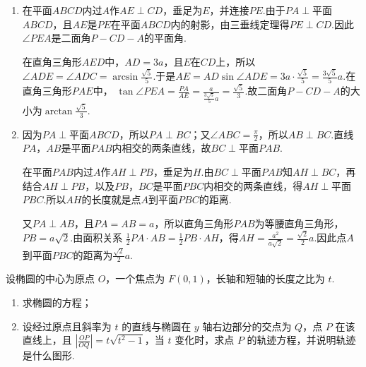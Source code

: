 \begin{solution}
\begin{enumerate}
\item 在平面\(ABCD\)内过\(A\)作\(AE\perp CD\)，垂足为\(E\)，并连接\(PE\).由于\(PA\perp\)平面\(ABCD\)，且\(AE\)是\(PE\)在平面\(ABCD\)内的射影，由三垂线定理得\(PE\perp CD\).因此\(\angle PEA\)是二面角\(P-CD-A\)的平面角.

在直角三角形\(AED\)中，\(AD=3a\)，且\(E\)在\(CD\)上，所以\(\angle ADE=\angle ADC=\arcsin\frac{\sqrt5}{5}\).于是\(AE=AD\sin\angle ADE=3a\cdot\frac{\sqrt5}{5}=\frac{3\sqrt5}{5}a\).在直角三角形\(PAE\)中，
\(\tan\angle PEA=\frac{PA}{AE}=\frac{a}{\frac{3\sqrt5}{5}a}=\frac{\sqrt5}{3}\).故二面角\(P-CD-A\)的大小为\(\arctan\frac{\sqrt5}{3}\).

\item 因为\(PA\perp\)平面\(ABCD\)，所以\(PA\perp BC\)；又\(\angle ABC=\frac{\pi}{2}\)，所以\(AB\perp BC\).直线\(PA\)，\(AB\)是平面\(PAB\)内相交的两条直线，故\(BC\perp\)平面\(PAB\).

在平面\(PAB\)内过\(A\)作\(AH\perp PB\)，垂足为\(H\).由\(BC\perp\)平面\(PAB\)知\(AH\perp BC\)，再结合\(AH\perp PB\)，以及\(PB\)，\(BC\)是平面\(PBC\)内相交的两条直线，得\(AH\perp\)平面\(PBC\).所以\(AH\)的长度就是点\(A\)到平面\(PBC\)的距离.

又\(PA\perp AB\)，且\(PA=AB=a\)，所以直角三角形\(PAB\)为等腰直角三角形，\(PB=a\sqrt2\).由面积关系
\(\frac12PA\cdot AB=\frac12PB\cdot AH\)，得\(AH=\frac{a^2}{a\sqrt2}=\frac{\sqrt2}{2}a\).因此点\(A\)到平面\(PBC\)的距离为\(\frac{\sqrt2}{2}a\).
\end{enumerate}
\end{solution}

\begin{problem}
设椭圆的中心为原点 \(O\)，一个焦点为 \(F(0,1)\)，长轴和短轴的长度之比为 \(t\).
\begin{enumerate}
\item 求椭圆的方程；
\item 设经过原点且斜率为 \(t\) 的直线与椭圆在 \(y\) 轴右边部分的交点为 \(Q\)，点 \(P\) 在该直线上，且 \(\left|\frac{OP}{OQ}\right| = t\sqrt{t^2 - 1}\)，当 \(t\) 变化时，求点 \(P\) 的轨迹方程，并说明轨迹是什么图形.
\end{enumerate}
\end{problem}

